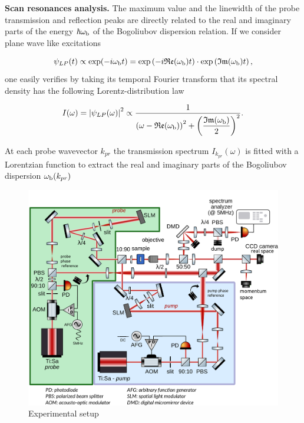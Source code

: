  \textbf{Scan resonances analysis.} The maximum value and the linewidth of the probe transmission and reflection peaks are directly related to the real and imaginary parts of the energy $\hbar \omega_{\mathrm{b}}$ of the Bogoliubov dispersion relation.
  If we consider plane wave like excitations

\begin{equation}
    \psi_{LP}(t) \propto \mathrm{exp} (-i \omega_{\mathrm{b}} t) = \mathrm{exp} \left (- i \mathfrak{Re} (\omega_{\mathrm{b}}) t \right ) \cdot \mathrm{exp} \left( \mathfrak{Im} (\omega_{\mathrm{b}}) t \right),
\end{equation}
one easily verifies by taking its temporal Fourier transform that its spectral density has the following Lorentz-distribution law

\begin{equation}
    I(\omega) = \abs{\psi_{LP}(\omega)}^2 \propto \dfrac{1}{ \left(\omega - \mathfrak{Re}(\omega_{\mathrm{b}}) \right)^2 + \left( \dfrac{\mathfrak{Im}(\omega_{\mathrm{b}})}{2} \right)^2}.
\end{equation}

At each probe wavevector $k_{pr}$ the transmission spectrum $I_{k_{pr}}(\omega)$ is fitted with a Lorentzian function to extract the real and imaginary parts of the Bogoliubov dispersion $\omega_{\mathrm{b}}(k_{pr})$

 \begin{figure}
    \centering
    \includegraphics[width=1\textwidth]{chap_custom_st/fig/set_up_spacetime.pdf}
    \caption{Experimental setup}
    \label{fig:setup}
\end{figure}





